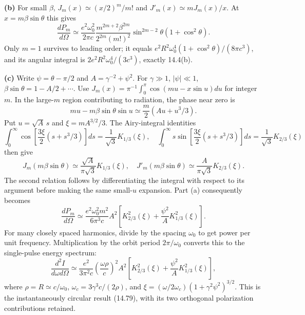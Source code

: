 \textbf{(b)} For small $\beta$,
$J_m(x)\simeq(x/2)^m/m!$ and $J'_m(x)\simeq mJ_m(x)/x$.
At $x=m\beta\sin\theta$ this gives
\[
\boxed{\frac{dP_m}{d\Omega}\simeq
\frac{e^2\omega_0^2}{2\pi c}
\frac{m^{2m+2}\beta^{2m}}{2^{2m}(m!)^2}
\sin^{2m-2}\theta(1+\cos^2\theta).}
\]
Only $m=1$ survives to leading order; it equals
$e^2R^2\omega_0^4(1+\cos^2\theta)/(8\pi c^3)$, and its angular integral
is $2e^2R^2\omega_0^4/(3c^3)$, exactly 14.4(b).

\textbf{(c)} Write $\psi=\theta-\pi/2$ and
$A=\gamma^{-2}+\psi^2$. For $\gamma\gg1$, $|\psi|\ll1$,
$\beta\sin\theta=1-A/2+\cdots$.
Use $J_m(x)=\pi^{-1}\int_0^\pi\cos(mu-x\sin u)du$ for integer $m$.
In the large-$m$ region contributing to radiation, the phase near zero is
\[
mu-m\beta\sin\theta\sin u
\simeq\frac m2(Au+u^3/3).
\]
Put $u=\sqrt A\,s$ and $\xi=mA^{3/2}/3$. The Airy-integral identities
\[
\int_0^\infty\cos\left[\frac{3\xi}{2}(s+s^3/3)\right]ds
=\frac1{\sqrt3}K_{1/3}(\xi),\quad
\int_0^\infty s\sin\left[\frac{3\xi}{2}(s+s^3/3)\right]ds
=\frac1{\sqrt3}K_{2/3}(\xi)
\]
then give
\[
J_m(m\beta\sin\theta)\simeq\frac{\sqrt A}{\pi\sqrt3}K_{1/3}(\xi),
\quad
J'_m(m\beta\sin\theta)\simeq\frac A{\pi\sqrt3}K_{2/3}(\xi).
\]
The second relation follows by differentiating the integral with respect
to its argument before making the same small-$u$ expansion.
Part (a) consequently becomes
\[
\frac{dP_m}{d\Omega}\simeq
\frac{e^2\omega_0^2m^2}{6\pi^3c}A^2
\left[K_{2/3}^2(\xi)+\frac{\psi^2}{A}K_{1/3}^2(\xi)\right].
\]
For many closely spaced harmonics, divide by the spacing $\omega_0$
to get power per unit frequency. Multiplication by the orbit period
$2\pi/\omega_0$ converts this to the single-pulse energy spectrum:
\[
\boxed{\frac{d^2I}{d\omega d\Omega}\simeq
\frac{e^2}{3\pi^2c}\left(\frac{\omega\rho}{c}\right)^2A^2
\left[K_{2/3}^2(\xi)+\frac{\psi^2}{A}K_{1/3}^2(\xi)\right],}
\]
where $\rho=R\simeq c/\omega_0$,
$\omega_c=3\gamma^3c/(2\rho)$, and
$\xi=(\omega/2\omega_c)(1+\gamma^2\psi^2)^{3/2}$.
This is the instantaneously circular result (14.79), with its two
orthogonal polarization contributions retained.

